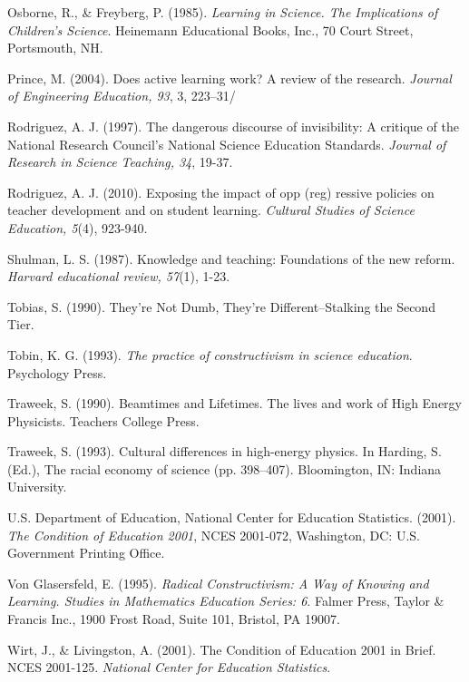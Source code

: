 \documentclass[11.5pt]{sig-alternate} %
\begin{document}
Osborne, R., \& Freyberg, P. (1985). \textit{Learning in Science. The Implications of Children's Science}. Heinemann Educational Books, Inc., 70 Court Street, Portsmouth, NH.

Prince, M. (2004). Does active learning work? A review of the research. \textit{Journal of Engineering Education, 93}, 3, 223–31/

Rodriguez, A. J. (1997).  The dangerous discourse of invisibility: A critique of the National Research Council’s National Science Education Standards.  \textit{Journal of Research in Science Teaching, 34}, 19-37.

Rodriguez, A. J. (2010). Exposing the impact of opp (reg) ressive policies on teacher development and on student learning. \textit{Cultural Studies of Science Education, 5}(4), 923-940.

Shulman, L. S. (1987). Knowledge and teaching: Foundations of the new reform. \textit{Harvard educational review, 57}(1), 1-23.

Tobias, S. (1990). They're Not Dumb, They're Different--Stalking the Second Tier.

Tobin, K. G. (1993). \textit{The practice of constructivism in science education}. Psychology Press.

Traweek, S. (1990). Beamtimes and Lifetimes. The lives and work of High Energy Physicists.  Teachers College Press.

Traweek, S. (1993). Cultural differences in high-energy physics. In Harding, S. (Ed.), The racial economy of science (pp. 398–407). Bloomington, IN: Indiana University.

U.S. Department of Education, National Center for Education Statistics. (2001). \textit{The Condition of Education 2001}, NCES 2001-072, Washington, DC: U.S. Government Printing Office.

Von Glasersfeld, E. (1995). \textit{Radical Constructivism: A Way of Knowing and Learning. Studies in Mathematics Education Series: 6}. Falmer Press, Taylor \& Francis Inc., 1900 Frost Road, Suite 101, Bristol, PA 19007.

Wirt, J., \& Livingston, A. (2001). The Condition of Education 2001 in Brief. NCES 2001-125. \textit{National Center for Education Statistics}.
\end{document}
